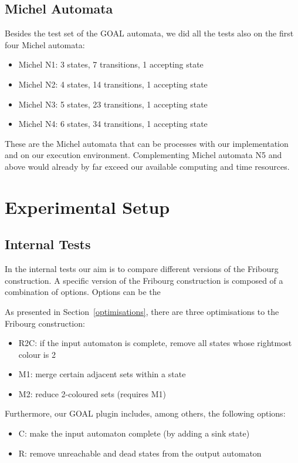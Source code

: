 \subsection{Michel Automata}
Besides the test set of the GOAL automata, we did all the tests also on the first four Michel automata:
\begin{itemize}
\item Michel N1: 3 states, 7 transitions, 1 accepting state
\item Michel N2: 4 states, 14 transitions, 1 accepting state
\item Michel N3: 5 states, 23 transitions, 1 accepting state
\item Michel N4: 6 states, 34 transitions, 1 accepting state
\end{itemize}

These are the Michel automata that can be processes with our implementation and on our execution environment. Complementing Michel automata N5 and above would already by far exceed our available computing and time resources.


\section{Experimental Setup}

\subsection{Internal Tests}
\label{4_internal}
In the internal tests our aim is to compare different versions of the Fribourg construction. A specific version of the Fribourg construction is composed of a combination of options. Options can be the 

As presented in Section~\ref{optimisations}, there are three optimisations to the Fribourg construction:
\begin{itemize}
\item R2C: if the input automaton is complete, remove all states whose rightmost colour is 2
\item M1: merge certain adjacent sets within a state
\item M2: reduce 2-coloured sets (requires M1)
\end{itemize}

Furthermore, our GOAL plugin includes, among others, the following options:
\begin{itemize}
\item C: make the input automaton complete (by adding a sink state)
\item R: remove unreachable and dead states from the output automaton
\end{itemize}

